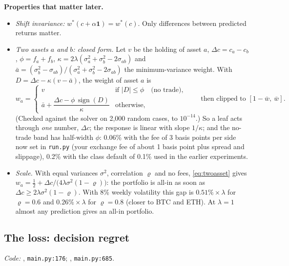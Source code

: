 \documentclass[11pt,a4paper]{article}
\newcommand{\1}{\mathbf{1}}
\newcommand{\code}[1]{\texttt{\detokenize{#1}}}
\begin{document}
\textbf{Properties that matter later.}
\begin{itemize}
\item \emph{Shift invariance:} $w^\ast(c+\alpha\1)=w^\ast(c)$. Only differences between predicted returns matter.
\item \emph{Two assets $a$ and $b$: closed form.} Let $v$ be the holding of asset $a$, $\Delta c=c_a-c_b$, $\phi=f_a+f_b$, $\kappa=2\lambda(\sigma_a^2+\sigma_b^2-2\sigma_{ab})$ and $\bar a=(\sigma_b^2-\sigma_{ab})/(\sigma_a^2+\sigma_b^2-2\sigma_{ab})$ the minimum-variance weight. With $D=\Delta c-\kappa(v-\bar a)$, the weight of asset $a$ is
\begin{equation}
w_a=\begin{cases} v & \text{if } |D|\le\phi \quad\text{(no trade)},\\[2pt]
\bar a+\dfrac{\Delta c-\phi\,\operatorname{sign}(D)}{\kappa} & \text{otherwise,}\end{cases}
\qquad\text{then clipped to }[1-\bar w,\ \bar w].
\label{eq:twoasset}
\end{equation}
(Checked against the solver on 2,000 random cases, to $10^{-14}$.) So a leaf acts through \emph{one} number, $\Delta c$; the response is linear with slope $1/\kappa$; and the no-trade band has half-width $\phi$: 0.06\% with the fee of 3 basis points per side now set in \texttt{run.py} (your exchange fee of about 1 basis point plus spread and slippage), 0.2\% with the class default of 0.1\% used in the earlier experiments.
\item \emph{Scale.} With equal variances $\sigma^2$, correlation $\varrho$ and no fees, \eqref{eq:twoasset} gives $w_a=\tfrac12+\Delta c/\big(4\lambda\sigma^2(1-\varrho)\big)$: the portfolio is all-in as soon as $\Delta c\ge 2\lambda\sigma^2(1-\varrho)$. With 8\% weekly volatility this gap is $0.51\%\times\lambda$ for $\varrho=0.6$ and $0.26\%\times\lambda$ for $\varrho=0.8$ (closer to BTC and ETH). At $\lambda=1$ almost any prediction gives an all-in portfolio.
\end{itemize}

\subsection{The loss: decision regret}
{\small\emph{Code:} \code{utility}, \texttt{main.py:176}; \code{_score_prediction}, \texttt{main.py:685}.}
\end{document}
